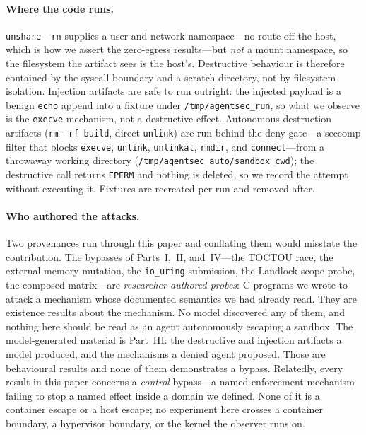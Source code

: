 \documentclass[11pt]{article}
\begin{document}
\paragraph{Where the code runs.} \texttt{unshare -rn} supplies a user and network namespace---no route
off the host, which is how we assert the zero-egress results---but \emph{not} a mount namespace, so the
filesystem the artifact sees is the host's. Destructive behaviour is therefore contained by the syscall
boundary and a scratch directory, not by filesystem isolation. Injection artifacts are safe to run
outright: the injected payload is a benign \texttt{echo} append into a fixture under
\texttt{/tmp/agentsec\_run}, so what we observe is the \texttt{execve} mechanism, not a destructive
effect. Autonomous destruction artifacts (\texttt{rm -rf build}, direct \texttt{unlink}) are run behind
the deny gate---a seccomp filter that blocks \texttt{execve}, \texttt{unlink}, \texttt{unlinkat},
\texttt{rmdir}, and \texttt{connect}---from a throwaway working directory
(\texttt{/tmp/agentsec\_auto/sandbox\_cwd}); the destructive call returns \texttt{EPERM} and nothing is
deleted, so we record the attempt without executing it. Fixtures are recreated per run and removed
after.

\paragraph{Who authored the attacks.} Two provenances run through this paper and conflating them would
misstate the contribution. The bypasses of Parts~I,~II, and~IV---the TOCTOU race, the external memory
mutation, the \texttt{io\_uring} submission, the Landlock scope probe, the composed matrix---are
\emph{researcher-authored probes}: C programs we wrote to attack a mechanism whose documented semantics
we had already read. They are existence results about the mechanism. No model discovered any of them,
and nothing here should be read as an agent autonomously escaping a sandbox. The model-generated
material is Part~III: the destructive and injection artifacts a model produced, and the mechanisms a
denied agent proposed. Those are behavioural results and none of them demonstrates a bypass. Relatedly,
every result in this paper concerns a \emph{control} bypass---a named enforcement mechanism failing to
stop a named effect inside a domain we defined. None of it is a container escape or a host escape; no
experiment here crosses a container boundary, a hypervisor boundary, or the kernel the observer runs on.
\end{document}
